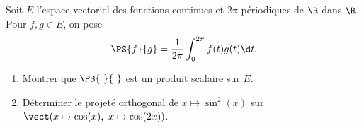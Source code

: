 \begin{enonce}
\begin{exercise}[ID={RMS135 E1432},subtitle={IMT MP 2024},tags={},difficulty={}]

Soit $E$ l’espace vectoriel des fonctions continues et $2\pi$-périodiques de $\R$ dans $\R$.
Pour $f, g \in E$, on pose
\[
  \PS{f}{g} = \frac{1}{2\pi} \int_0^{2\pi} f(t)g(t) \d t.
\]
\begin{enumerate}
  \item Montrer que $\PS{\ }{\ }$ est un produit scalaire sur $E$.
  \item Déterminer le projeté orthogonal de $x \mapsto \sin^2(x)$ sur $\vect(x \mapsto \cos(x),\ x \mapsto \cos(2x))$.
\end{enumerate}

\end{exercise}
\begin{solution}
\end{solution}
\end{enonce}
